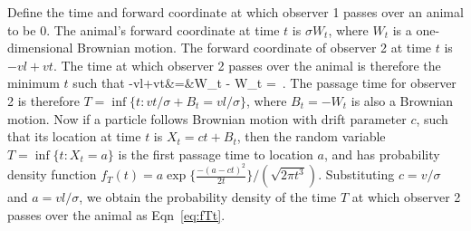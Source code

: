 \documentclass[useAMS, usenatbib, referee]{biom}\usepackage[]{graphicx}\usepackage[]{color}
\begin{document}
Define the time and forward coordinate at which observer 1 passes over an animal to be 0. The animal's forward coordinate at time $t$ is $\sigma W_t$, where $W_t$ is a one-dimensional Brownian motion. The forward coordinate of observer 2 at time $t$ is $-vl+vt$. The time at which observer 2 passes over the animal is therefore the minimum $t$ such that
\be
-vl+vt&=&\sigma W_t \;\;\;\Rightarrow \;\;\; - W_t \;=\; \,.
\ee
\noindent
The passage time for observer 2 is therefore $T=\inf\{t: vt/\sigma + B_t = vl/\sigma\}$, where $B_t=-W_t$ is also a Brownian motion. Now if a particle follows Brownian motion with drift parameter $c$, such that its location at time $t$ is $X_t=ct+B_t$, then the random variable $T=\inf\{t: X_t=a\}$ is the first passage time to location $a$, and has probability density function $f_{T} (t) = a \exp \Big\{ \frac{- (a-ct)^2}{2t} \Big\} / (\sqrt{2 \pi t^3})$. Substituting $c=v/\sigma$ and $a=vl/\sigma$, we obtain the probability density of the time $T$ at which observer 2 passes over the animal as Eqn~\eqref{eq:fTt}.




\end{document}
